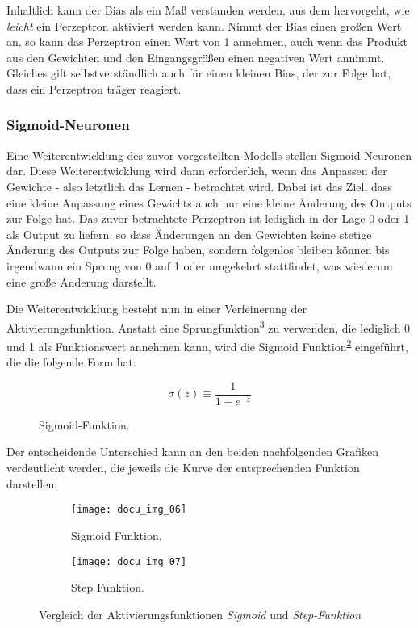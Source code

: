 Inhaltlich kann der Bias als ein Maß verstanden werden, aus dem hervorgeht, wie \textit{leicht} ein Perzeptron aktiviert werden kann. Nimmt der Bias einen großen Wert an, so kann das Perzeptron einen Wert von 1 annehmen, auch wenn das Produkt aus den Gewichten und den Eingangsgrößen einen negativen Wert annimmt. Gleiches gilt selbstverständlich auch für einen kleinen Bias, der zur Folge hat, dass ein Perzeptron träger reagiert.

\subsubsection{Sigmoid-Neuronen}

Eine Weiterentwicklung des zuvor vorgestellten Modells stellen Sigmoid-Neuronen dar. Diese Weiterentwicklung wird dann erforderlich, wenn das Anpassen der Gewichte - also letztlich das Lernen - betrachtet wird. Dabei ist das Ziel, dass eine kleine Anpassung eines Gewichts auch nur eine kleine Änderung des Outputs zur Folge hat. Das zuvor betrachtete Perzeptron ist lediglich in der Lage 0 oder 1 als Output zu liefern, so dass Änderungen an den Gewichten keine stetige Änderung des Outputs zur Folge haben, sondern folgenlos bleiben können bis irgendwann ein Sprung von 0 auf 1 oder umgekehrt stattfindet, was wiederum eine große Änderung darstellt.

Die Weiterentwicklung besteht nun in einer Verfeinerung der Aktivierungsfunktion. Anstatt eine Sprungfunktion\textsuperscript{\ref{fig:step-function}} zu verwenden, die lediglich 0 und 1 als Funktionswert annehmen kann, wird die Sigmoid Funktion\textsuperscript{\ref{fig:sigmoid-function}} eingeführt, die die folgende Form hat:

\begin{figure}[H]
    \centering
    \[ \sigma(z) \equiv
          \frac{1}{1+e^{-z}}
    \]
    \caption{Sigmoid-Funktion.}
    \label{fig:sigmoid}
\end{figure}

Der entscheidende Unterschied kann an den beiden nachfolgenden Grafiken verdeutlicht werden, die jeweils die Kurve der entsprechenden Funktion darstellen:

\captionsetup[subfigure]{labelformat=empty, labelsep=none}
\begin{figure}[H]
    \centering
    \begin{subfigure}{0.45\textwidth}
		\texttt{[image: docu\_img\_06]}
		\caption{\tiny{Sigmoid Funktion.}}
		\label{fig:sigmoid-function}
	\end{subfigure}
    \begin{subfigure}{0.45\textwidth}
		\texttt{[image: docu\_img\_07]}
		\caption{\tiny{Step Funktion.}}
		\label{fig:step-function}
	\end{subfigure}

    \caption{Vergleich der Aktivierungsfunktionen \textit{Sigmoid} und \textit{Step-Funktion}}
    \label{fig:activation-functions}
\end{figure}

